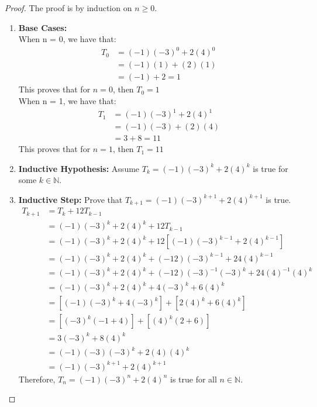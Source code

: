 \documentclass[11pt]{article}
\theoremstyle{definition}
\theoremstyle{definition}
\theoremstyle{definition}
\begin{document}
\begin{proof}
The proof is by induction on $n \geq 0$. 
\begin{enumerate}
    \item \textbf{Base Cases:} \\
    When n = 0, we have that: 
    \begin{align*}
        T_0 &= (-1)(-3)^0 + 2(4)^0 \\
        &= (-1)(1) + (2)(1) \\
        &= (-1) + 2 = 1 
    \end{align*}
    This proves that for $n = 0$, then $T_0 = 1$ \\
    When n = 1, we have that:
    \begin{align*}
        T_1 &= (-1)(-3)^1 + 2(4)^1 \\
        &= (-1)(-3) + (2)(4) \\
        &= 3 + 8 = 11
    \end{align*}
    This proves that for $n = 1$, then $T_1 = 11$ 
    \item \textbf{Inductive Hypothesis:}
    Assume $T_k = (-1)(-3)^k + 2(4)^k $ is true for some $k \in \mathbb{N}$. 
    \item \textbf{Inductive Step:}
    Prove that $T_{k+1} = (-1)(-3)^{k+1} + 2(4)^{k+1}$ is true. 
    \begin{align*}
            T_{k+1} &= T_k + 12T_{k-1} \\
            &= (-1)(-3)^k + 2(4)^k + 12T_{k-1} \\
            &= (-1)(-3)^k + 2(4)^k + 12[(-1)(-3)^{k-1} + 2(4)^{k-1}]\\
            &= (-1)(-3)^k + 2(4)^k + (-12)(-3)^{k-1} + 24(4)^{k-1} \\
            &= (-1)(-3)^k + 2(4)^k + (-12)(-3)^{-1}(-3)^k + 24(4)^{-1}(4)^k \\
            &= (-1)(-3)^k + 2(4)^k + 4(-3)^k + 6(4)^k \\
            &= [(-1)(-3)^k + 4(-3)^k] + [2(4)^k + 6(4)^k] \\
            &= [(-3)^k(-1+4)] + [(4)^k(2+6)]\\
            &= 3(-3)^k + 8(4)^k \\
            &= (-1)(-3)(-3)^k + 2(4)(4)^k \\
            &= (-1)(-3)^{k+1} + 2(4)^{k+1} 
    \end{align*}
    Therefore, $T_n = (-1)(-3)^n + 2(4)^n$ is true for all $n \in \mathbb{N}$.
\end{enumerate}
\end{proof}
\end{document}
